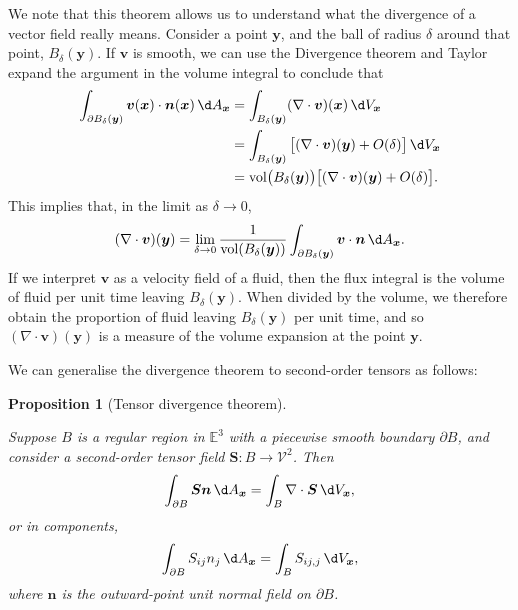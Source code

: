 \documentclass[
  letterpaper,
  DIV=11,
  numbers=noendperiod]{scrreprt}
\theoremstyle{plain}
\newtheorem{proposition}{Proposition}[chapter]
\theoremstyle{remark}
\begin{document}
We note that this theorem allows us to understand what the divergence of
a vector field really means. Consider a point \({\boldsymbol{y}}\), and
the ball of radius \(\delta\) around that point,
\(B_\delta({\boldsymbol{y}})\). If \({\boldsymbol{v}}\) is smooth, we
can use the Divergence theorem and Taylor expand the argument in the
volume integral to conclude that \[\begin{aligned}
  \int_{\partial B_\delta({\boldsymbol{y}})}{\boldsymbol{v}}({\boldsymbol{x}})\cdot{\boldsymbol{n}}({\boldsymbol{x}}){\,\d A_{{\boldsymbol{x}}}}
  &= \int_{B_\delta({\boldsymbol{y}})}(\nabla \cdot {\boldsymbol{v}})({\boldsymbol{x}}){\,\d V_{{\boldsymbol{x}}}}\\
  &= \int_{B_\delta({\boldsymbol{y}})}\big[(\nabla \cdot {\boldsymbol{v}})({\boldsymbol{y}})+{O}(\delta)\big]{\,\d V_{{\boldsymbol{x}}}}\\
  &= {\operatorname{vol}}\big(B_\delta({\boldsymbol{y}})\big)\big[(\nabla \cdot {\boldsymbol{v}})({\boldsymbol{y}})+{O}(\delta)\big].
\end{aligned}\] This implies that, in the limit as \(\delta\to0\),
\[(\nabla \cdot {\boldsymbol{v}})({\boldsymbol{y}}) = \lim_{\delta\to0}\frac{1}{{\operatorname{vol}}(B_\delta({\boldsymbol{y}}))}\int_{\partial B_\delta({\boldsymbol{y}})}{\boldsymbol{v}}\cdot{\boldsymbol{n}}{\,\d A_{{\boldsymbol{x}}}}.\]
If we interpret \({\boldsymbol{v}}\) as a velocity field of a fluid,
then the flux integral is the volume of fluid per unit time leaving
\(B_\delta({\boldsymbol{y}})\). When divided by the volume, we therefore
obtain the proportion of fluid leaving \(B_\delta({\boldsymbol{y}})\)
per unit time, and so
\((\nabla\cdot{\boldsymbol{v}})({\boldsymbol{y}})\) is a measure of the
volume expansion at the point \({\boldsymbol{y}}\).

We can generalise the divergence theorem to second-order tensors as
follows:

\begin{proposition}[Tensor divergence
theorem]\protect\hypertarget{prp-tensordivthm}{}\label{prp-tensordivthm}

Suppose \(B\) is a regular region in \({\mathbb{E}}^3\) with a piecewise
smooth boundary \(\partial B\), and consider a second-order tensor field
\({\boldsymbol{S}}:B\to{\mathcal{V}}^2\). Then
\[\int_{\partial B} {\boldsymbol{S}}{\boldsymbol{n}}{\,\d A_{{\boldsymbol{x}}}}= \int_B\nabla\cdot{\boldsymbol{S}}{\,\d V_{{\boldsymbol{x}}}},\]
or in components,
\[\int_{\partial B}S_{ij}n_j {\,\d A_{{\boldsymbol{x}}}}= \int_BS_{ij,j} {\,\d V_{{\boldsymbol{x}}}},\]
where \({\boldsymbol{n}}\) is the outward-point unit normal field on
\(\partial B\).

\end{proposition}
\end{document}
